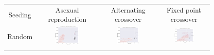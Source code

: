 \documentclass{article}
\begin{document}
\begin{landscape}
\begin{figure}[t]
\begin{center}
\begin{tabular}{c c c c}
    Seeding & Asexual reproduction & Alternating crossover & Fixed point crossover \\
    Random & \includegraphics[align=c,width=0.42\textwidth]{gd/e2/1} & \includegraphics[align=c,width=0.42\textwidth]{gd/e2/2} & \includegraphics[align=c,width=0.42\textwidth]{gd/e2/3} \\
    & & & \\

\end{tabular}
\end{center}
\end{figure}
\end{landscape}
\end{document}
